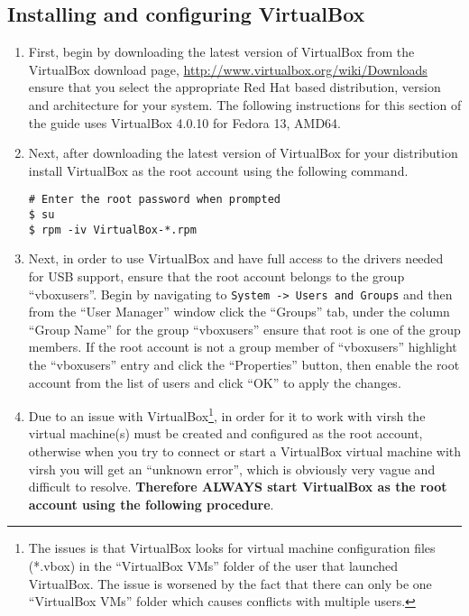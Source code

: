 \subsection{Installing and configuring VirtualBox}
\label{sec:rhvbox}
\begin{enumerate}
\item	First, begin by downloading the latest version of VirtualBox from the VirtualBox download page,
		\url{http://www.virtualbox.org/wiki/Downloads} ensure that you select the appropriate Red Hat based
		distribution, version and architecture for your system. The following instructions for this section of
		the guide uses VirtualBox 4.0.10 for Fedora 13, AMD64.
		
\item	Next, after downloading the latest version of VirtualBox for your distribution install VirtualBox as the root
		account using the following command.
\begin{lstlisting}
# Enter the root password when prompted
$ su
$ rpm -iv VirtualBox-*.rpm
\end{lstlisting}	

\item	Next, in order to use VirtualBox and have full access to the drivers needed for USB support, ensure that the root
		account belongs to the group ``vboxusers''. Begin by navigating to \verb|System -> Users and Groups| and then from
		the ``User Manager'' window click the ``Groups'' tab, under the column ``Group Name'' for the group ``vboxusers'' 
		ensure that root is one of the group members. If the root account is not a group member of ``vboxusers'' highlight
		the ``vboxusers'' entry and click the ``Properties'' button, then enable the root account from the list of users
		and click ``OK'' to apply the changes.
		
\item	Due to an issue with VirtualBox\footnote{The issues is that VirtualBox looks for virtual machine configuration files (*.vbox)
		in the ``VirtualBox VMs'' folder of the user that launched VirtualBox. The issue is worsened by the fact that there can
		only be one ``VirtualBox VMs'' folder which causes conflicts with multiple users.}, in order for it to work with virsh 
		the virtual machine(s) must be created and configured as the root account, otherwise when you try to connect or start a 
		VirtualBox virtual machine with virsh you will get an ``unknown error'', which is obviously very vague and difficult to 
		resolve. {\bf Therefore ALWAYS start VirtualBox as the root account using the following procedure}.


\end{enumerate}
